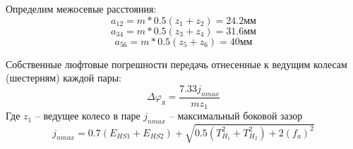 \documentclass{article}
\begin{document}
\begin{enumerate}
	Определим межосевые расстояния:
	$$
	a_{12} = m * 0.5 (z_1 + z_2) = 24.2 мм
	$$
	$$
	a_{34} = m * 0.5 (z_3 + z_4) = 31.6 мм
	$$
	$$
	a_{56} = m * 0.5 (z_5 + z_6) = 40 мм
	$$

	Собственные люфтовые погрешности передачь отнесенные к ведущим колесам (шестерням) каждой пары:
	$$
	\Delta\varphi_л = \frac{7.33 j_{n max}}{m z_1}
	$$
	Где $z_1$ -- ведущее колесо в паре
	$j_{n max}$ -- максимальный боковой зазор
	$$
	j_{n max} = 0.7 (E_{HS1} + E_{HS2}) + \sqrt {0.5 (T_{H_1}^2 + T_{H_2}^2) + 2 (f_a)^2}	
	$$
\end{enumerate}
\end{document}
